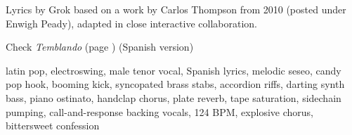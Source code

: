 
\begin{notes}
Lyrics by Grok based on a work by Carlos Thompson from 2010 (posted under Enwigh Peady), adapted in close interactive collaboration.

Check \emph{Temblando} (page \pageref{sec:temblando}) (Spanish version)
\end{notes}
\begin{style}
latin pop, electroswing, male tenor vocal, Spanish lyrics, melodic seseo, candy pop hook, booming kick, syncopated brass stabs, accordion riffs, darting synth bass, piano ostinato, handclap chorus, plate reverb, tape saturation, sidechain pumping, call-and-response backing vocals, 124 BPM, explosive chorus, bittersweet confession
\end{style}
